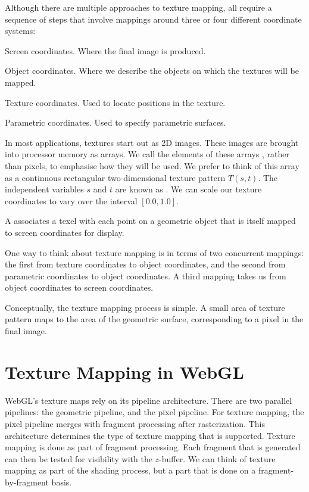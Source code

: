 \documentclass[../COS3712_Notes.tex]{subfiles}
\begin{document}
      Although there are multiple approaches to texture mapping, all require a sequence
      of steps that involve mappings around three or four different coordinate systems:
      \begin{descriptimize}
        \item[Screen coordinates.] Where the final image is produced.
        \item[Object coordinates.] Where we describe the objects on which the textures will
          be mapped.
        \item[Texture coordinates.] Used to locate positions in the texture.
        \item[Parametric coordinates.] Used to specify parametric surfaces.
      \end{descriptimize}

      In most applications, textures start out as 2D images.
      These images are brought into processor memory as arrays.
      We call the elements of these arrays ,
      rather than pixels, to emphasise how they will be used.
      We prefer to think of this array as a continuous rectangular two-dimensional texture pattern
      $T(s, t)$.
      The independent variables $s$ and $t$ are known as .
      We can scale our texture coordinates to vary over the interval $[0.0, 1.0]$.

      A  associates a texel with each point on a geometric object
      that is itself mapped to screen coordinates for display.

      One way to think about texture mapping is in terms of two concurrent mappings:
      the first from texture coordinates to object coordinates,
      and the second from parametric coordinates to object coordinates.
      A third mapping takes us from object coordinates to screen coordinates.

      Conceptually, the texture mapping process is simple.
      A small area of texture pattern maps to the area of the geometric surface,
      corresponding to a pixel in the final image.

    \section{Texture Mapping in WebGL}
      WebGL's texture maps rely on its pipeline architecture.
      There are two parallel pipelines: the geometric pipeline, and the pixel pipeline.
      For texture mapping, the pixel pipeline merges with fragment processing after rasterization.
      This architecture determines the type of texture mapping that is supported.
      Texture mapping is done as part of fragment processing.
      Each fragment that is generated can then be tested for visibility with the $z$-buffer.
      We can think of texture mapping as part of the shading process, but a part that is done
      on a fragment-by-fragment basis.
\end{document}
